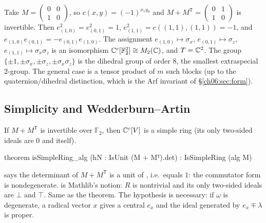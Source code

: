 \begin{example}[$n=2$: the Pauli matrices]\label{ch06:ex:pauli}
Take $M=\begin{pmatrix}0&0\\1&0\end{pmatrix}$, so $c(x,y)=(-1)^{x_1y_0}$ and
$M+M^{\mathsf T}=\begin{pmatrix}0&1\\1&0\end{pmatrix}$ is invertible.  Then $e_{(1,0)}^2=e_{(0,1)}^2=1$,
$e_{(1,1)}^2=c((1,1),(1,1))=-1$, and $e_{(1,0)}e_{(0,1)}=-e_{(0,1)}e_{(1,0)}$.  The assignment
$e_{(1,0)}\mapsto\sigma_x$, $e_{(0,1)}\mapsto\sigma_z$, $e_{(1,1)}\mapsto\sigma_x\sigma_z$ is an
isomorphism ${\mathbb{C}}^c[\mathbb F_2^2]\cong M_2({\mathbb{C}})$, and $T={\mathbb{C}}^2$.  The group $\{\pm1,\pm\sigma_x,
\pm\sigma_z,\pm\sigma_x\sigma_z\}$ is the dihedral group of order $8$, the smallest extraspecial
$2$-group.  The general case is a tensor product of $m$ such blocks (up to the
quaternion/dihedral distinction, which is the Arf invariant of \S\ref{ch06:sec:form}).
\end{example}

\subsection{Simplicity and Wedderburn--Artin}

\begin{theorem}\label{ch06:thm:simple}
If $M+M^{\mathsf T}$ is invertible over $\mathbb F_2$, then ${\mathbb{C}}^c[V]$ is a simple ring (its only
two-sided ideals are $0$ and itself).
\end{theorem}
\begin{leancode}
theorem isSimpleRing_alg (hN : IsUnit (M + Mᵀ).det) : IsSimpleRing (alg M)
\end{leancode}
\begin{dictionary}
 says the determinant of $M+M^{\mathsf T}$ is a unit of ,
i.e.\ equals $1$: the commutator form is nondegenerate.   is Mathlib's notion:
$R$ is nontrivial and its only two-sided ideals are $\bot$ and $\top$.  Same as the theorem.  The
hypothesis is necessary: if $\omega$ is degenerate, a radical vector $x$ gives a central $e_x$ and
the ideal generated by $e_x\mp\lambda$ is proper.
\end{dictionary}

